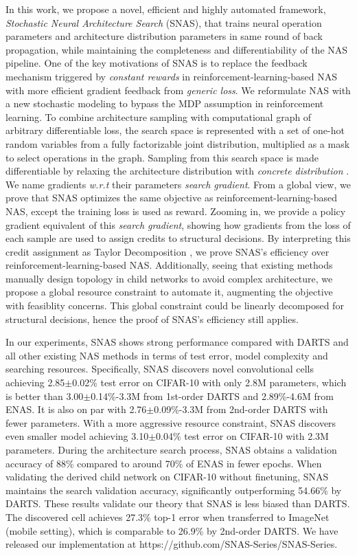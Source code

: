 \documentclass{article} \usepackage{iclr2019_conference,times}
\newcommand{\zh}{\color{black}}
\begin{document}
In this work, we propose a novel, efficient and highly automated framework, \textit{Stochastic Neural Architecture Search} (SNAS), that trains neural operation parameters and architecture distribution parameters in same round of back propagation, while maintaining the completeness and {\zh differentiability} of the NAS pipeline. One of the key motivations of SNAS is to replace the feedback mechanism triggered by \textit{constant rewards} in reinforcement-learning-based NAS with more efficient gradient feedback from \textit{generic loss}. We reformulate NAS with a new stochastic modeling to bypass the MDP assumption in reinforcement learning. To combine architecture sampling with computational graph of arbitrary differentiable loss, the search space is represented with a set of one-hot random variables from a fully factorizable joint distribution, multiplied as a mask to select operations in the graph. Sampling from this search space is made differentiable by relaxing the architecture distribution with \textit{concrete distribution} \citep{maddison2016concrete}. We name gradients \textit{w.r.t} their parameters \textit{search gradient}. From a global view, we prove that SNAS optimizes the same objective as reinforcement-learning-based NAS, except the training loss is used as reward. Zooming in, we provide a policy gradient equivalent of this \textit{search gradient}, showing how gradients from the loss of each sample {\zh are} used to assign credits to structural decisions. By interpreting this credit assignment as Taylor Decomposition \citep{montavon2017explaining}, we prove SNAS's efficiency over reinforcement-learning-based NAS. Additionally, seeing that existing methods \citep{liu2018darts} manually design topology in child networks to avoid complex architecture, we propose a global resource constraint to automate it, augmenting the objective with feasiblity concerns. This global constraint could be linearly decomposed for structural decisions, hence the proof of SNAS's efficiency still applies.

In our experiments, SNAS shows strong performance compared with DARTS and all other existing NAS methods in terms of test error, model complexity and searching resources. Specifically, SNAS discovers novel convolutional cells achieving 2.85$\pm$0.02\% test error on CIFAR-10 with only 2.8M parameters, which is better than 3.00$\pm$0.14\%-3.3M from 1st-order DARTS and 2.89\%-4.6M from ENAS. It is also on par with 2.76$\pm$0.09\%-3.3M from 2nd-order DARTS with {\zh fewer} parameters. With a more aggressive resource constraint, SNAS discovers even smaller model achieving {\zh 3.10$\pm$0.04\%} test error on CIFAR-10 with 2.3M parameters. During the architecture search process, SNAS obtains a validation accuracy of 88\% compared to around 70\% of ENAS in {\zh fewer} epochs. When validating the derived child network on CIFAR-10 without finetuning, SNAS maintains the search validation accuracy, significantly outperforming 54.66\% by DARTS. These results validate our theory that SNAS is less biased than DARTS. The discovered cell achieves 27.3\% top-1 error when transferred to ImageNet (mobile setting), which is comparable to 26.9\% by 2nd-order DARTS. We have released our implementation at https://github.com/SNAS-Series/SNAS-Series. 
\end{document}
